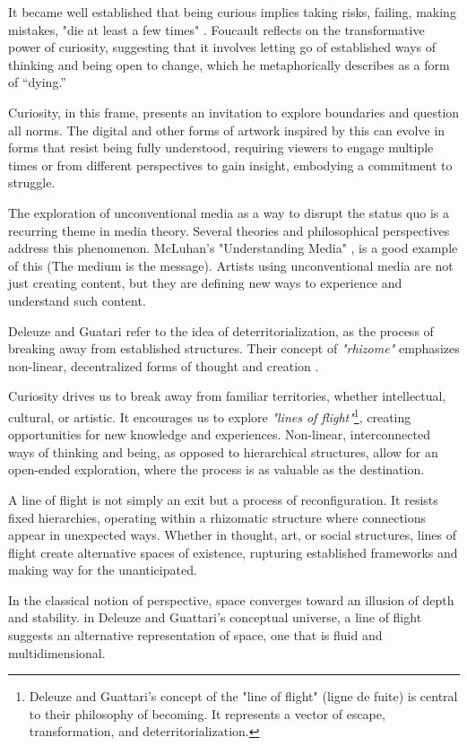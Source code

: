 It became well established that being curious implies taking risks, failing, making mistakes, "die at least a few times" \citep{foucault1980masked}. Foucault reflects on the transformative power of curiosity, suggesting that it involves letting go of established ways of thinking and being open to change, which he metaphorically describes as a form of “dying.”

Curiosity, in this frame, presents an invitation to explore boundaries and question all norms. The digital and other forms of artwork inspired by this can evolve in forms that resist being fully understood, requiring viewers to engage multiple times or from different perspectives to gain insight, embodying a commitment to struggle.

The exploration of unconventional media as a way to disrupt the status quo is a recurring theme in media theory. Several theories and philosophical perspectives address this phenomenon. McLuhan's "Understanding Media" \citep{mcluhan1964}, is a good example of this (The medium is the message). Artists using unconventional media are not just creating content, but they are defining new ways to experience and understand such content.

Deleuze and Guatari refer to the idea of deterritorialization, as the process of breaking away from established structures. Their concept of \textit{"rhizome"} emphasizes non-linear, decentralized forms of thought and creation \citep{deleuze1980}.

Curiosity drives us to break away from familiar territories, whether intellectual, cultural, or artistic. It encourages us to explore \textit{"lines of flight"}\footnote{Deleuze and Guattari's concept of the "line of flight" (ligne de fuite) is central to their philosophy of becoming. It represents a vector of escape, transformation, and deterritorialization.}, creating opportunities for new knowledge and experiences. Non-linear, interconnected ways of thinking and being, as opposed to hierarchical structures, allow for an open-ended exploration, where the process is as valuable as the destination.

A line of flight is not simply an exit but a process of reconfiguration. It resists fixed hierarchies, operating within a rhizomatic structure where connections appear in unexpected ways. Whether in thought, art, or social structures, lines of flight create alternative spaces of existence, rupturing established frameworks and making way for the unanticipated.

In the classical notion of perspective, space converges toward an illusion of depth and stability. in Deleuze and Guattari's conceptual universe, a line of flight suggests an alternative representation of space, one that is fluid and multidimensional.
